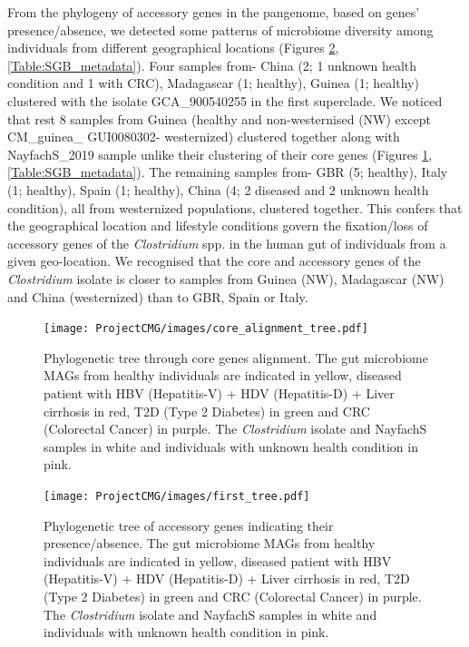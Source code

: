 \documentclass[11pt]{article}
\begin{document}
From the phylogeny of accessory genes in the pangenome, based on genes' presence/absence, we detected some patterns of microbiome diversity among individuals from different geographical locations (Figures \ref{fig:Fast_Tree_Presence_Absence},\ref{Table:SGB_metadata}). Four samples from- China (2; 1 unknown health condition and 1 with CRC), Madagascar (1; healthy), Guinea (1; healthy) clustered with the isolate GCA\_900540255 in the first superclade. We noticed that rest 8 samples from Guinea (healthy and non-westernised (NW) except CM\_guinea\_ GUI0080302- westernized) clustered together along with NayfachS\_2019 sample unlike their clustering of their core genes (Figures \ref{fig:Fast_Tree_Core_alignment}, \ref{Table:SGB_metadata}). The remaining samples from- GBR (5; healthy), Italy (1; healthy), Spain (1; healthy), China (4; 2 diseased and 2 unknown health condition), all from westernized populations, clustered together. This confers that the geographical location and lifestyle conditions govern the fixation/loss of accessory genes  of the \textit{Clostridium} spp. in the human gut of individuals from a given geo-location. We recognised that the core and accessory genes of the \textit{Clostridium} isolate is closer to samples from Guinea (NW), Madagascar (NW) and China (westernized)  than to GBR, Spain or Italy. 

\begin{figure}
    \centering
       \texttt{[image: ProjectCMG/images/core\_alignment\_tree.pdf]}
    \caption{Phylogenetic tree through core genes alignment. The gut microbiome MAGs from healthy individuals are indicated in yellow, diseased patient with HBV (Hepatitis-V) + HDV (Hepatitis-D) + Liver cirrhosis in red, T2D (Type 2 Diabetes) in green and CRC (Colorectal Cancer) in purple. The \textit{Clostridium} isolate and NayfachS samples in white and individuals with unknown health condition in pink.}
    \label{fig:Fast_Tree_Core_alignment}
\end{figure}

\begin{figure}
    \centering
       \texttt{[image: ProjectCMG/images/first\_tree.pdf]}
    \caption{Phylogenetic tree of accessory genes indicating their presence/absence. The gut microbiome MAGs from healthy individuals are indicated in yellow, diseased patient with HBV (Hepatitis-V) + HDV (Hepatitis-D) + Liver cirrhosis in red, T2D (Type 2 Diabetes) in green and CRC (Colorectal Cancer) in purple. The \textit{Clostridium} isolate and NayfachS samples in white and individuals with unknown health condition in pink. }
    \label{fig:Fast_Tree_Presence_Absence}
\end{figure}
\end{document}
